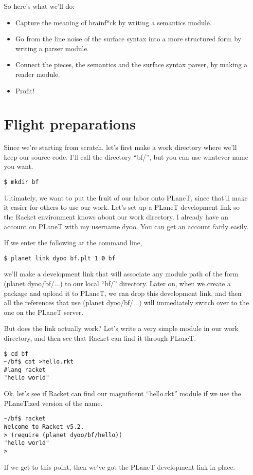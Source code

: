 \documentclass{article}
\begin{document}
So here's what we'll do:
\begin{itemize}
\item Capture the meaning of brainf*ck by writing a semantics module.

\item Go from the line noise of the surface syntax into a more structured form by writing a parser module.

\item Connect the pieces, the semantics and the surface syntax parser, by making a reader module.

\item Profit!
\end{itemize}


\section{Flight preparations}
Since we're starting from scratch, let's first make a work directory where we'll keep our source code. I'll call the directory ``bf/'', but you can use whatever name you want.
\begin{verbatim}
$ mkdir bf
\end{verbatim}
Ultimately, we want to put the fruit of our labor onto PLaneT, since that'll make it easier for others to use our work. Let's set up a PLaneT development link so the Racket environment knows about our work directory. I already have an account on PLaneT with my username dyoo. You can get an account fairly easily.

If we enter the following at the command line,
\begin{verbatim}
$ planet link dyoo bf.plt 1 0 bf
\end{verbatim}
we'll make a development link that will associate any module path of the form (planet dyoo/bf/...) to our local ``bf/'' directory. Later on, when we create a package and upload it to PLaneT, we can drop this development link, and then all the references that use (planet dyoo/bf/...) will immediately switch over to the one on the PLaneT server.


But does the link actually work? Let's write a very simple module in our work directory, and then see that Racket can find it through PLaneT.
\begin{verbatim}
$ cd bf
~/bf$ cat >hello.rkt
#lang racket
"hello world"
\end{verbatim}
Ok, let's see if Racket can find our magnificent ``hello.rkt'' module if we use the PLaneTized version of the name.
\begin{verbatim}
~/bf$ racket
Welcome to Racket v5.2.
> (require (planet dyoo/bf/hello))
"hello world"
>
\end{verbatim}
If we get to this point, then we've got the PLaneT development link in place.
\end{document}
